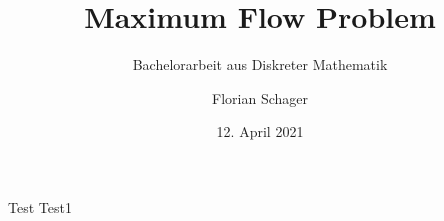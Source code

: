 \documentclass[aspectratio=169]{beamer}
\title[Maximum Flow Problem]{Maximum Flow Problem}
\subtitle{Bachelorarbeit aus Diskreter Mathematik}
\author[F. Schager]{Florian Schager}
\institute[TU Wien]{TU Wien, Vienna, Austria}
\date{12. April 2021}
\begin{document}
\begin{frame}
    \titlepage
\end{frame}


\begin{frame}{Test}
  Test1
\end{frame}
\end{document}
